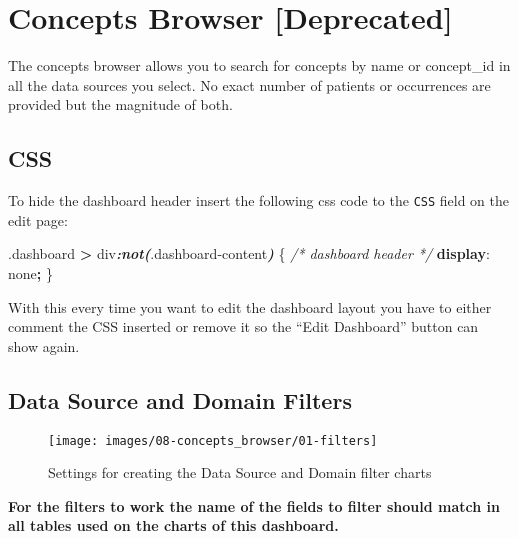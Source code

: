 \documentclass[
]{book}
\newenvironment{Shaded}{\begin{snugshade}}{\end{snugshade}}
\newcommand{\CommentTok}[1]{\textcolor[rgb]{0.56,0.35,0.01}{\textit{#1}}}
\newcommand{\DecValTok}[1]{\textcolor[rgb]{0.00,0.00,0.81}{#1}}
\newcommand{\FunctionTok}[1]{\textcolor[rgb]{0.00,0.00,0.00}{#1}}
\newcommand{\InformationTok}[1]{\textcolor[rgb]{0.56,0.35,0.01}{\textbf{\textit{#1}}}}
\newcommand{\KeywordTok}[1]{\textcolor[rgb]{0.13,0.29,0.53}{\textbf{#1}}}
\newcommand{\NormalTok}[1]{#1}
\newcommand{\OperatorTok}[1]{\textcolor[rgb]{0.81,0.36,0.00}{\textbf{#1}}}
\begin{document}
\hypertarget{concepts-browser-deprecated}{%
\section{Concepts Browser {[}Deprecated{]}}\label{concepts-browser-deprecated}}

The concepts browser allows you to search for concepts by name or concept\_id in all the data sources you select. No exact number of patients or occurrences are provided but the magnitude of both.

\hypertarget{css-7}{%
\subsection*{CSS}\label{css-7}}

To hide the dashboard header insert the following css code to the \texttt{CSS} field on the edit page:

\begin{Shaded}
\begin{Highlighting}[]
\FunctionTok{.dashboard} \OperatorTok{\textgreater{}}\NormalTok{ div}\InformationTok{:not(}\FunctionTok{.dashboard{-}content}\InformationTok{)}\NormalTok{ \{  }\CommentTok{/* dashboard header */}
  \KeywordTok{display}\NormalTok{: }\DecValTok{none}\OperatorTok{;}
\NormalTok{\}}
\end{Highlighting}
\end{Shaded}

With this every time you want to edit the dashboard layout you have to either comment the CSS inserted
or remove it so the ``Edit Dashboard'' button can show again.

\hypertarget{data-source-and-domain-filters}{%
\subsection*{Data Source and Domain Filters}\label{data-source-and-domain-filters}}

\begin{figure}
\texttt{[image: images/08-concepts\_browser/01-filters]} \caption{Settings for creating the Data Source and Domain filter charts}\label{fig:filters}
\end{figure}

\textbf{For the filters to work the name of the fields to filter should match in all tables used on the charts of this dashboard.}
\end{document}

